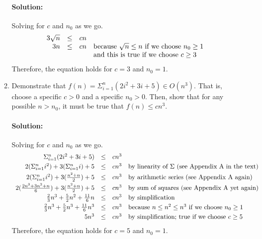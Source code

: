\documentclass{article}
\begin{document}
\begin{enumerate}
\begin{enumerate}
    \paragraph{Solution:} Solving for \(c\) and \(n_0\) as we go.
    \[
    \begin{array}{rcll}
      3 \sqrt{n} &\leq& cn \\
      3n &\leq& cn
      & $because $ \sqrt{n} \leq n $ if we choose $ n_0 \geq 1 \\
      &&& $and this is true if we choose $ c \geq 3
    \end{array}
    \]
    Therefore, the equation holds for \(c=3\) and \(n_0=1\).

    \bigskip

    \pagebreak[1]
  \item Demonstrate that
    \(f(n) = \Sigma_{i=1}^{n} (2i^2+3i+5) \in O(n^3)\).
    That is, choose a specific \(c>0\) and a specific \(n_0 > 0\).
    Then, show that for any possible \(n > n_0\), it must be true that
    \(f(n) \leq c n^3\).

    \paragraph{Solution:} Solving for \(c\) and \(n_0\) as we go.
    \[
    \begin{array}{rcll}
      \Sigma_{i=1}^{n} (2i^2+3i+5) &\leq& cn^3 \smallskip \\
      2(\Sigma_{i=1}^{n} i^2) + 3(\Sigma_{i=1}^{n} i) + 5 &\leq& cn^3
      & $by linearity of $ \Sigma $ (see Appendix A in the text)$ \smallskip \\
      2(\Sigma_{i=1}^{n} i^2) + 3(\frac{n^2+n}{2}) + 5 &\leq& cn^3
      & $by arithmetic series (see Appendix A again)$ \smallskip \\
      2(\frac{2n^3+3n^2+n}{6}) + 3(\frac{n^2+n}{2}) + 5 &\leq& cn^3
      & $by sum of squares (see Appendix A yet again)$ \smallskip \\
      \frac{2}{3}n^3 + \frac{5}{2}n^2 + \frac{11}{6}n &\leq& cn^3
      & $by simplification$ \smallskip \\
      \frac{2}{3}n^3 + \frac{5}{2}n^3 + \frac{11}{6}n^3 &\leq& cn^3
      & $because $ n \leq n^2 \leq n^3 $ if we choose $ n_0 \geq 1 \smallskip \\
      5n^3 &\leq& cn^3
      & $by simplification; true if we choose $ c \geq 5
    \end{array}
    \]
    Therefore, the equation holds for \(c=5\) and \(n_0=1\).


\end{enumerate}
\end{enumerate}
\end{document}
